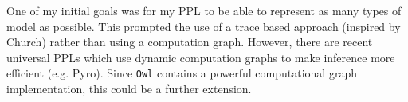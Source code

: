 \documentclass[sigconf]{acmart}
\begin{document}
One of my initial goals was for my PPL to be able to represent as many types of model as possible. This prompted the use of a trace based approach (inspired by Church) rather than using a computation graph. However, there are recent universal PPLs which use dynamic computation graphs to make inference more efficient (e.g. Pyro). Since \texttt{Owl} contains a powerful computational graph implementation, this could be a further extension.


{
  \clearpage
  
  
}
\end{document}
